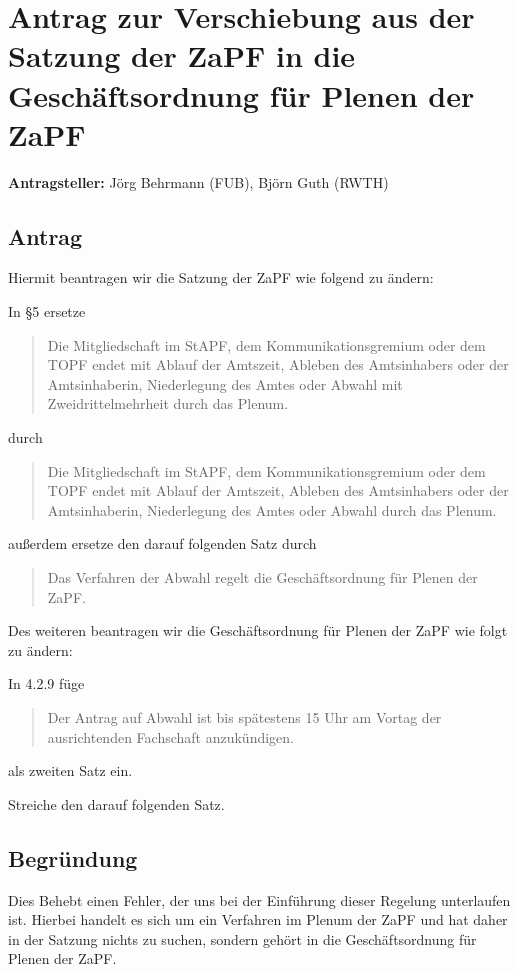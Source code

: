 \documentclass[draft,10pt,oneside]{scrartcl}
\begin{document}
\section*{Antrag zur Verschiebung aus der Satzung der ZaPF in die
		Geschäftsordnung für Plenen der ZaPF}

\textbf{Antragsteller:} Jörg Behrmann (FUB), Björn Guth (RWTH)

\subsection*{Antrag}

Hiermit beantragen wir die Satzung der ZaPF wie folgend zu ändern:

In §5 ersetze
\begin{quote}
	Die Mitgliedschaft im StAPF, dem Kommunikationsgremium oder dem TOPF endet
	mit Ablauf der Amtszeit, Ableben des Amtsinhabers oder der Amtsinhaberin,
	Niederlegung des Amtes oder Abwahl mit Zweidrittelmehrheit durch das
	Plenum.
\end{quote}
durch
\begin{quote}
	Die Mitgliedschaft im StAPF, dem Kommunikationsgremium oder dem TOPF endet
	mit Ablauf der Amtszeit, Ableben des Amtsinhabers oder der Amtsinhaberin,
	Niederlegung des Amtes oder Abwahl durch das Plenum.
\end{quote}
außerdem ersetze den darauf folgenden Satz durch
\begin{quote}
	Das Verfahren der Abwahl regelt die Geschäftsordnung für Plenen der ZaPF.
\end{quote}
\vspace{0.5cm}
Des weiteren beantragen wir die Geschäftsordnung für Plenen der ZaPF wie folgt
zu ändern:

In 4.2.9 füge
\begin{quote}
	Der Antrag auf Abwahl ist bis spätestens 15 Uhr am Vortag der ausrichtenden
	Fachschaft anzukündigen.
\end{quote}
als zweiten Satz ein.

Streiche den darauf folgenden Satz.

\subsection*{Begründung}
Dies Behebt einen Fehler, der uns bei der Einführung dieser Regelung
unterlaufen ist. Hierbei handelt es sich um ein Verfahren im Plenum der ZaPF
und hat daher in der Satzung nichts zu suchen, sondern gehört in die
Geschäftsordnung für Plenen der ZaPF.
\end{document}
